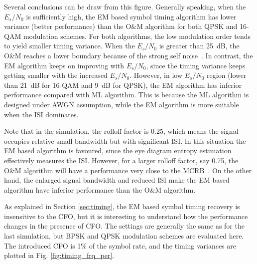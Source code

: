 \documentclass[journal,comsoc, onecolumn, 12pt,draftclsnofoot]{IEEEtran} %
\begin{document}
Several conclusions can be draw from this figure.
Generally speaking, when the  \(E_s/N_0\) is sufficiently high, the EM based symbol timing algorithm has lower variance (better performance) than the O\&M algorithm for both QPSK and 16-QAM modulation schemes.
For both algorithms, the low modulation order tends to yield smaller timing variance.
When the \(E_s/N_0\) is greater than 25~dB, the O\&M reaches a lower boundary because of the strong self noise~\cite{mengali1997synchronization}. 
% 
% 
In contrast, the EM algorithm keeps on improving with \(E_s/N_0\), since the timing variance keeps getting smaller with the increased \(E_s/N_0\).
However, in low \(E_s/N_0\) region (lower than 21~dB for 16-QAM and 9~dB for QPSK), the EM algorithm has inferior performance compared with ML algorithm.
This is because the ML algorithm is designed under AWGN assumption, while the EM algorithm is more suitable when the ISI dominates.


Note that in the simulation, the rolloff factor is 0.25, which means the signal occupies relative small bandwidth but with significant ISI.
In this situation the EM based algorithm is favoured, since the eye diagram entropy estimation effectively measures the ISI.
However, for a larger rolloff factor, say 0.75, the O\&M algorithm will have a performance very close to the MCRB~\cite{mengali1997synchronization}.
% 
% 
On the other hand, the enlarged signal bandwidth and reduced ISI make the EM based algorithm have inferior performance than the O\&M algorithm.

As explained in Section \ref{sec:timing}, the EM based symbol timing recovery is insensitive to the CFO, but it is interesting to understand how the performance changes in the presence of CFO. 
The settings are generally the same as for the last simulation, but BPSK and QPSK modulation schemes are evaluated here.
The introduced CFO is 1\% of the symbol rate, and the timing variances are plotted in Fig. \ref{fig:timing_frq_per}.
\end{document}
